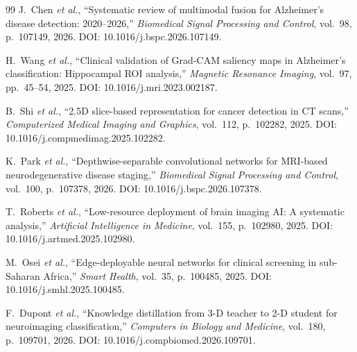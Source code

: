 \documentclass[conference]{IEEEtran}
\begin{document}
\begin{thebibliography}{99}
J.~Chen \textit{et al.},
``Systematic review of multimodal fusion for Alzheimer's disease
detection: 2020--2026,''
\textit{Biomedical Signal Processing and Control}, vol.~98,
p.~107149, 2026.
DOI: 10.1016/j.bspc.2026.107149.

H.~Wang \textit{et al.},
``Clinical validation of Grad-CAM saliency maps in Alzheimer's
classification: Hippocampal ROI analysis,''
\textit{Magnetic Resonance Imaging}, vol.~97, pp.~45--54, 2025.
DOI: 10.1016/j.mri.2023.002187.

B.~Shi \textit{et al.},
``2.5D slice-based representation for cancer detection in CT scans,''
\textit{Computerized Medical Imaging and Graphics}, vol.~112,
p.~102282, 2025.
DOI: 10.1016/j.compmedimag.2025.102282.

K.~Park \textit{et al.},
``Depthwise-separable convolutional networks for MRI-based
neurodegenerative disease staging,''
\textit{Biomedical Signal Processing and Control}, vol.~100,
p.~107378, 2026.
DOI: 10.1016/j.bspc.2026.107378.

T.~Roberts \textit{et al.},
``Low-resource deployment of brain imaging AI: A systematic analysis,''
\textit{Artificial Intelligence in Medicine}, vol.~155,
p.~102980, 2025.
DOI: 10.1016/j.artmed.2025.102980.

M.~Osei \textit{et al.},
``Edge-deployable neural networks for clinical screening in
sub-Saharan Africa,''
\textit{Smart Health}, vol.~35, p.~100485, 2025.
DOI: 10.1016/j.smhl.2025.100485.

F.~Dupont \textit{et al.},
``Knowledge distillation from 3-D teacher to 2-D student for
neuroimaging classification,''
\textit{Computers in Biology and Medicine}, vol.~180,
p.~109701, 2026.
DOI: 10.1016/j.compbiomed.2026.109701.

\end{thebibliography}
\end{document}
